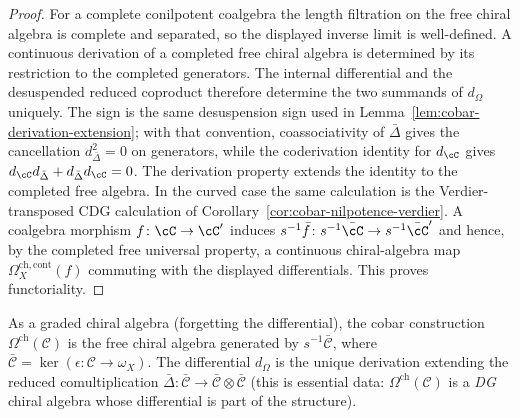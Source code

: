 \begin{proof}
For a complete conilpotent coalgebra the length filtration on the
free chiral algebra is complete and separated, so the displayed
inverse limit is well-defined. A continuous derivation of a completed
free chiral algebra is determined by its restriction to the completed
generators. The internal differential and the desuspended reduced
coproduct therefore determine the two summands of $d_\Omega$
uniquely. The sign is the same desuspension sign used in
Lemma~\ref{lem:cobar-derivation-extension}; with that convention,
coassociativity of $\bar\Delta$ gives the cancellation
$d_{\bar\Delta}^2=0$ on generators, while the coderivation identity
for $d_\cC$ gives $d_\cC d_{\bar\Delta}+d_{\bar\Delta}d_\cC=0$.
The derivation property extends the identity to the completed free
algebra. In the curved case the same calculation is the
Verdier-transposed CDG calculation of
Corollary~\ref{cor:cobar-nilpotence-verdier}. A coalgebra morphism
$f\colon\cC\to\cC'$ induces
$s^{-1}\bar f\colon s^{-1}\bar\cC\to s^{-1}\bar\cC'$ and hence, by the
completed free universal property, a continuous chiral-algebra map
$\Omega^{\mathrm{ch,cont}}_X(f)$ commuting with the displayed
differentials. This proves functoriality.
\end{proof}

\begin{theorem}\label{thm:cobar-free}
As a graded chiral algebra (forgetting the differential), the cobar
construction $\Omega^{\mathrm{ch}}(\mathcal{C})$ is the free chiral
algebra generated by $s^{-1}\bar{\mathcal{C}}$, where
$\bar{\mathcal{C}} = \ker(\epsilon\colon \mathcal{C} \to \omega_X)$.
The differential $d_\Omega$ is the unique derivation extending the
reduced comultiplication
$\bar{\Delta}\colon \bar{\mathcal{C}} \to
\bar{\mathcal{C}} \otimes \bar{\mathcal{C}}$
(this is essential data: $\Omega^{\mathrm{ch}}(\mathcal{C})$ is a
\emph{DG} chiral algebra whose differential is part of the structure).
\end{theorem}

